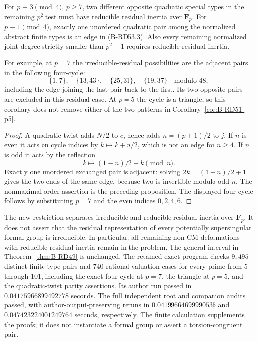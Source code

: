 \begin{corollary}
\label{cor:B-RD53-quadratic}
For $p\equiv3\pmod4$, $p\ge7$, two different opposite
quadratic special types in the remaining $p^2$ test must
have reducible residual inertia over $\mathbf F_p$.
For $p\equiv1\pmod4$, exactly one unordered quadratic pair
among the normalized abstract finite types is an edge in
(B-RD53.3). Also every remaining normalized joint degree
strictly smaller than $p^2-1$ requires reducible residual
inertia.

For example, at $p=7$ the irreducible-residual possibilities
are the adjacent pairs in the following four-cycle:
\[
 \{1,7\},\quad\{13,43\},\quad\{25,31\},\quad\{19,37\}
                 \quad\text{modulo }48,                \tag{B-RD53.5}
\]
including the edge joining the last pair back to the first.
Its two opposite pairs are excluded in this residual case.
At $p=5$ the cycle is a triangle, so this corollary does
not remove either of the two patterns in
Corollary~\ref{cor:B-RD51-p5}.
\end{corollary}
\begin{proof}
A quadratic twist adds $N/2$ to $c$, hence adds
$n=(p+1)/2$ to $j$. If $n$ is even it acts on cycle
indices by $k\mapsto k+n/2$, which is not an edge for
$n\ge4$. If $n$ is odd it acts by the reflection
\[
                    k\longmapsto(1-n)/2-k\pmod n.
\]
Exactly one unordered exchanged pair is adjacent: solving
$2k=(1-n)/2\mp1$ gives the two ends of the same edge,
because two is invertible modulo odd $n$.
The nonmaximal-order assertion is the preceding proposition.
The displayed four-cycle follows by substituting
$p=7$ and the even indices $0,2,4,6$.
\end{proof}

\begin{remark}
\label{rem:B-RD53-scope}
The new restriction separates irreducible and reducible
residual inertia over $\mathbf F_p$. It does not assert that
the residual representation of every potentially supersingular
formal group is irreducible. In particular, all remaining
non-CM deformations with reducible residual inertia remain
in the problem. The general interval in
Theorem~\ref{thm:B-RD49} is unchanged.
The retained exact program
checks $9{,}495$ distinct finite-type pairs and $740$
rational valuation cases for every prime from $5$ through
$101$, including the exact four-cycle at $p=7$, the
triangle at $p=5$, and the quadratic-twist parity assertions.
Its author run passed in $0.04175966899492778$ seconds.
The full independent root and companion audits passed, with
author-output-preserving reruns in $0.04199664699990535$ and
$0.047423224001249764$ seconds, respectively.
The finite calculation supplements the proofs; it does not
instantiate a formal group or assert a torsion-congruent pair.
\end{remark}

